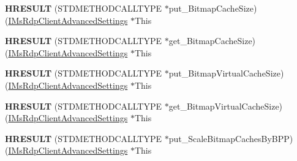 \begin{DoxyCompactItemize}
\item 
\mbox{\label{struct_m_s_t_s_c_lib_1_1_i_ms_rdp_client_advanced_settings_vtbl_af5930c3e408b8201e1abd26cab29dd17}} 
{\bfseries H\+R\+E\+S\+U\+LT} (S\+T\+D\+M\+E\+T\+H\+O\+D\+C\+A\+L\+L\+T\+Y\+PE $\ast$put\+\_\+\+Bitmap\+Cache\+Size)(\hyperlink{interface_m_s_t_s_c_lib_1_1_i_ms_rdp_client_advanced_settings}{I\+Ms\+Rdp\+Client\+Advanced\+Settings} $\ast$This
\item 
\mbox{\label{struct_m_s_t_s_c_lib_1_1_i_ms_rdp_client_advanced_settings_vtbl_ac65ee29b003d64796e138e22894dd739}} 
{\bfseries H\+R\+E\+S\+U\+LT} (S\+T\+D\+M\+E\+T\+H\+O\+D\+C\+A\+L\+L\+T\+Y\+PE $\ast$get\+\_\+\+Bitmap\+Cache\+Size)(\hyperlink{interface_m_s_t_s_c_lib_1_1_i_ms_rdp_client_advanced_settings}{I\+Ms\+Rdp\+Client\+Advanced\+Settings} $\ast$This
\item 
\mbox{\label{struct_m_s_t_s_c_lib_1_1_i_ms_rdp_client_advanced_settings_vtbl_a209d6cf0f1e7ae99c49452b5fc197b02}} 
{\bfseries H\+R\+E\+S\+U\+LT} (S\+T\+D\+M\+E\+T\+H\+O\+D\+C\+A\+L\+L\+T\+Y\+PE $\ast$put\+\_\+\+Bitmap\+Virtual\+Cache\+Size)(\hyperlink{interface_m_s_t_s_c_lib_1_1_i_ms_rdp_client_advanced_settings}{I\+Ms\+Rdp\+Client\+Advanced\+Settings} $\ast$This
\item 
\mbox{\label{struct_m_s_t_s_c_lib_1_1_i_ms_rdp_client_advanced_settings_vtbl_a3031a6efc8095917df174341a432b388}} 
{\bfseries H\+R\+E\+S\+U\+LT} (S\+T\+D\+M\+E\+T\+H\+O\+D\+C\+A\+L\+L\+T\+Y\+PE $\ast$get\+\_\+\+Bitmap\+Virtual\+Cache\+Size)(\hyperlink{interface_m_s_t_s_c_lib_1_1_i_ms_rdp_client_advanced_settings}{I\+Ms\+Rdp\+Client\+Advanced\+Settings} $\ast$This
\item 
\mbox{\label{struct_m_s_t_s_c_lib_1_1_i_ms_rdp_client_advanced_settings_vtbl_a9eb6d9f2cb1bc5c93058d234ae23fd4c}} 
{\bfseries H\+R\+E\+S\+U\+LT} (S\+T\+D\+M\+E\+T\+H\+O\+D\+C\+A\+L\+L\+T\+Y\+PE $\ast$put\+\_\+\+Scale\+Bitmap\+Caches\+By\+B\+PP)(\hyperlink{interface_m_s_t_s_c_lib_1_1_i_ms_rdp_client_advanced_settings}{I\+Ms\+Rdp\+Client\+Advanced\+Settings} $\ast$This

\end{DoxyCompactItemize}
